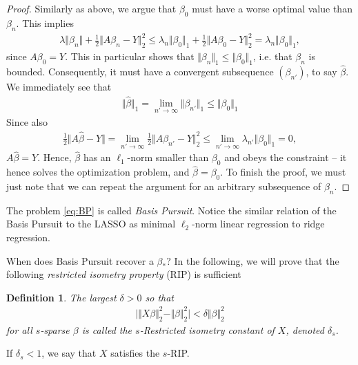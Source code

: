 \documentclass{article}
\newtheorem{defi}{Definition}
\newcommand{\abs}[1]{\vert #1 \vert}
\newcommand{\norm}[1]{\Vert #1 \Vert}
\begin{document}
\begin{proof}
    Similarly as above, we argue that $\beta_0$ must have a worse optimal value than $\beta_n$. This implies
    \begin{align*}
        \lambda \norm{\beta_n} + \tfrac{1}{2}\norm{A\beta_n- Y}_2^2 \leq \lambda_n \norm{\beta_0}_1 +\tfrac{1}{2}\norm{A\beta_0- Y}_2^2 = \lambda_n\norm{\beta_0}_1,
    \end{align*}
    since $A\beta_0 = Y$. This in particular shows that $\norm{\beta_n}_1 \leq \norm{\beta_0}_1$, i.e. that $\beta_n$ is bounded. Consequently, it must have a convergent subsequence $(\beta_{n'})$, to say $\hat{\beta}$. We immediately see that 
    \begin{align*}
        \norm{\hat{\beta}}_1 = \lim_{n'\to \infty }\norm{\beta_{n'}}_1 \leq \norm{\beta_0}_1
    \end{align*}
    Since also
    \begin{align*}
        \tfrac{1}{2}\norm{A\hat{\beta}-Y} = \lim_{n'\to \infty} \tfrac{1}{2}\norm{A\beta_{n'}- Y}_2^2 \leq \lim_{n'\to\infty}\lambda_{n'} \norm{\beta_0}_1 = 0,
    \end{align*}
    $A\hat{\beta}=Y$. Hence, $\hat{\beta}$ has an $\ell_1$-norm smaller than $\beta_0$ and obeys the constraint -- it hence solves the optimization problem, and $\hat{\beta}=\beta_0$. To finish the proof, we must just note that we can repeat the argument for an arbitrary subsequence of $\beta_n$.
   
\end{proof}

The problem \ref{eq:BP} is called \emph{Basis Pursuit}. Notice the similar relation of the Basis Pursuit to the LASSO as minimal $\ell_2$-norm linear regression to ridge regression.

When does Basis Pursuit recover a $\beta_*$? In the following, we will prove that the following \emph{restricted isometry property} (RIP) is sufficient
\begin{defi}
    The largest $\delta>0$ so that
    \begin{align*}
        \abs{\norm{X\beta}_2^2 - \norm{\beta}_2^2}< \delta\norm{\beta}_2^2
    \end{align*}
    for all $s$-sparse $\beta$ is called the $s$-Restricted isometry constant of $X$, denoted $\delta_s$. 
\end{defi}
If $\delta_s<1$, we say that $X$ satisfies the $s$-RIP.
\end{document}
